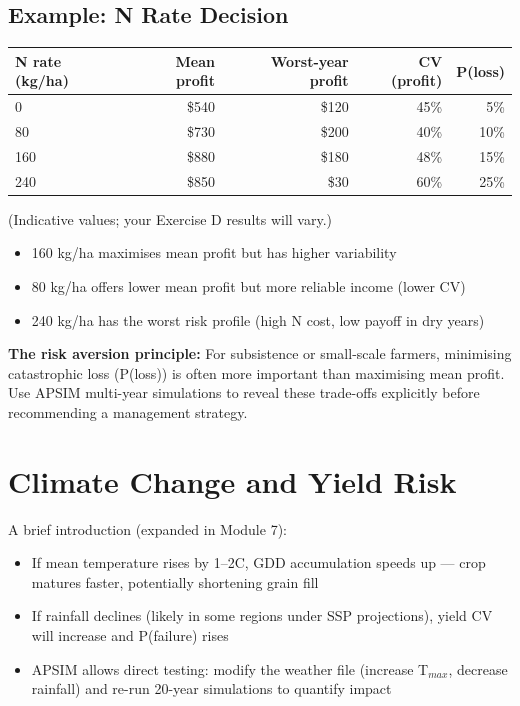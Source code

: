 \subsection{Example: N Rate Decision}

\begin{center}
\begin{tabular}{l|r|r|r|r}
\textbf{N rate (kg/ha)} & \textbf{Mean profit} & \textbf{Worst-year profit} & \textbf{CV (profit)} & \textbf{P(loss)} \\
\hline
0   & \$540 & \$120 & 45\% & 5\% \\
80  & \$730 & \$200 & 40\% & 10\% \\
160 & \$880 & \$180 & 48\% & 15\% \\
240 & \$850 & \$30  & 60\% & 25\% \\
\end{tabular}
\end{center}

(Indicative values; your Exercise D results will vary.)

\begin{itemize}
  \item 160 kg/ha maximises mean profit but has higher variability
  \item 80 kg/ha offers lower mean profit but more reliable income (lower CV)
  \item 240 kg/ha has the worst risk profile (high N cost, low payoff in dry years)
\end{itemize}

\begin{keyconceptbox}
\textbf{The risk aversion principle:} For subsistence or small-scale farmers, minimising catastrophic loss (P(loss)) is often more important than maximising mean profit. Use APSIM multi-year simulations to reveal these trade-offs explicitly before recommending a management strategy.
\end{keyconceptbox}

\section{Climate Change and Yield Risk}

A brief introduction (expanded in Module 7):

\begin{itemize}
  \item If mean temperature rises by 1--2\textdegree C, GDD accumulation speeds up --- crop matures faster, potentially shortening grain fill
  \item If rainfall declines (likely in some regions under SSP projections), yield CV will increase and P(failure) rises
  \item APSIM allows direct testing: modify the weather file (increase T$_{max}$, decrease rainfall) and re-run 20-year simulations to quantify impact
\end{itemize}

